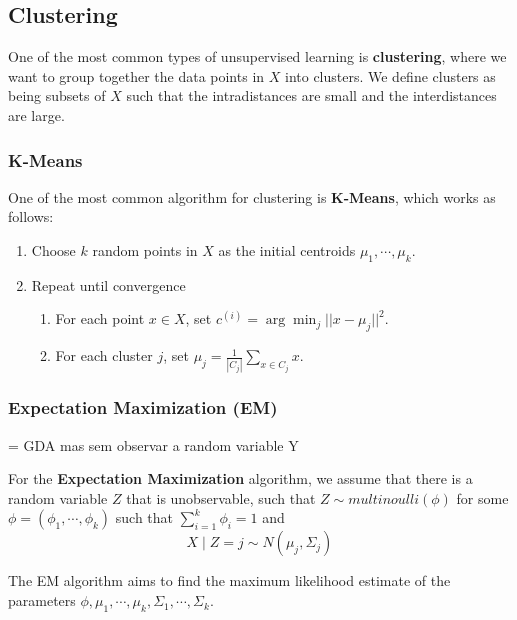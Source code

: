 \documentclass{article}
\begin{document}
\subsection{Clustering}

One of the most common types of unsupervised learning is \textbf{clustering}, where we want to group together the data points in $X$ into clusters.
We define clusters as being subsets of $X$ such that the intradistances are small and the interdistances are large.

\subsubsection{K-Means}

One of the most common algorithm for clustering is \textbf{K-Means}, which works as follows:
\begin{enumerate}
\item Choose $k$ random points in $X$ as the initial centroids $\mu_1, \cdots, \mu_k$.
\item Repeat until convergence
\begin{enumerate}
\item For each point $x \in X$, set $c^{(i)} = \arg\min_{j} ||x-\mu_j||^2$.
\item For each cluster $j$, set $\mu_j = \frac{1}{|C_j|} \sum_{x \in C_j} x$.
\end{enumerate}
\end{enumerate}

\subsubsection{Expectation Maximization (EM)}

= GDA mas sem observar a random variable Y

For the \textbf{Expectation Maximization} algorithm, we assume that there is a random variable $Z$ that is unobservable, such that $Z \sim multinoulli(\phi)$ for some $\phi = (\phi_1, \cdots, \phi_k)$ such that $\sum_{i=1}^k \phi_i = 1$ and 
$$
X \mid Z = j \sim N(\mu_j, \Sigma_j)
$$

The EM algorithm aims to find the maximum likelihood estimate of the parameters $\phi, \mu_1, \cdots, \mu_k, \Sigma_1, \cdots, \Sigma_k$.
\end{document}
